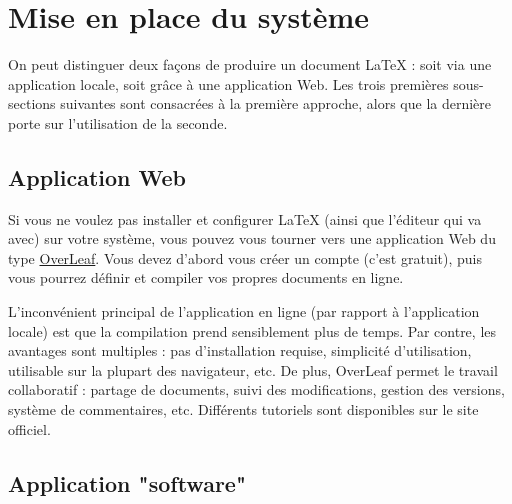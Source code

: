 \documentclass{ASD}
\begin{document}
\section{Mise en place du système}
On peut distinguer deux façons de produire un document \LaTeX{} : soit via une application locale, soit grâce à une application Web. Les trois premières sous-sections suivantes sont consacrées à la première approche, alors que la dernière porte sur l'utilisation de la seconde.

\subsection{Application Web}
Si vous ne voulez pas installer et configurer \LaTeX{} (ainsi que l'éditeur qui va avec) sur votre système, vous pouvez vous tourner vers une application Web du type \href{https://www.overleaf.com/signup?ref=d62cb1694be6}{OverLeaf}. Vous devez d'abord vous créer un compte (c'est gratuit), puis vous pourrez définir et compiler vos propres documents en ligne. 


L'inconvénient principal de l'application en ligne (par rapport à l'application locale) est que la compilation prend sensiblement plus de temps. Par contre, les avantages sont multiples :  pas d'installation requise, simplicité d'utilisation, utilisable sur la plupart des navigateur, etc. De plus, OverLeaf permet le travail collaboratif : partage de documents, suivi des modifications, gestion des versions, système de commentaires, etc. Différents tutoriels sont disponibles sur le site officiel.


\subsection{Application "software"}
\end{document}
